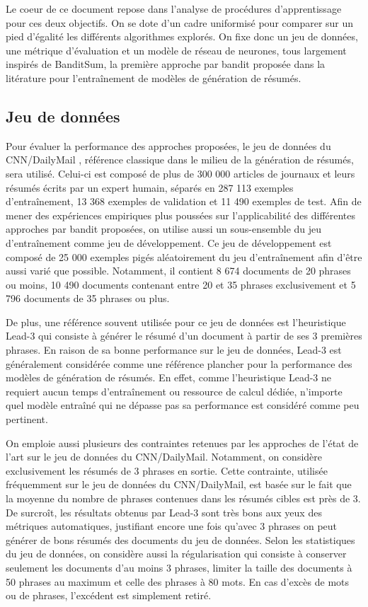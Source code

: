 Le coeur de ce document repose dans l'analyse de procédures 
d'apprentissage pour ces deux objectifs.
On se dote d'un cadre uniformisé pour comparer sur un pied d'égalité
les différents algorithmes explorés.
On fixe donc un jeu de données, une métrique d'évaluation 
et un modèle de réseau de neurones, tous largement inspirés
de BanditSum, la première approche par bandit proposée
dans la litérature pour 
l'entraînement de modèles de génération de résumés.


\subsection{Jeu de données}
\label{subsec:jeu_donnees}

Pour évaluer la performance des approches proposées, le jeu de données du
CNN/DailyMail \citep{hermann2015teaching}, référence classique dans le milieu
de la génération de résumés, sera utilisé.
Celui-ci est composé de plus de 300 000 articles de journaux et
leurs résumés écrits par un expert humain, séparés en 
287 113 exemples d'entraînement, 13 368 exemples de validation 
et 11 490 exemples de test.
Afin de mener des expériences empiriques plus poussées sur l'applicabilité
des différentes approches par bandit proposées, on utilise aussi un sous-ensemble 
du jeu d'entraînement comme jeu de développement.
Ce jeu de développement est composé de 25 000 exemples pigés 
aléatoirement du jeu d'entraînement afin d'être aussi varié que possible.
Notamment, il contient 8 674 documents de 20 phrases ou moins, 10 490
documents contenant entre 20 et 35 phrases exclusivement et 5 796 documents 
de 35 phrases ou plus.

De plus, une référence souvent utilisée pour ce jeu de données est l'heuristique
Lead-3 \citep{10.5555/3298483.3298681} qui consiste à générer le résumé d'un 
document à partir de ses 3 premières phrases.
En raison de sa bonne performance sur le jeu de données,
Lead-3 est généralement considérée comme une référence plancher pour la performance 
des modèles de génération de résumés.
En effet, comme l'heuristique Lead-3 ne requiert aucun temps d'entraînement 
ou ressource de calcul dédiée, n'importe quel modèle entraîné qui ne 
dépasse pas sa performance est considéré comme peu pertinent.

On emploie aussi plusieurs des contraintes retenues par les approches
de l'état de l'art sur le jeu de données du CNN/DailyMail.
Notamment, on considère exclusivement les résumés
de 3 phrases en sortie.
Cette contrainte, utilisée fréquemment sur le jeu de données du CNN/DailyMail,
est basée sur le fait que la moyenne du nombre de phrases contenues dans les résumés cibles
est près de 3.
De surcroît, les résultats obtenus par Lead-3 sont très bons aux yeux des métriques automatiques,
justifiant encore une fois qu'avec 3 phrases on peut générer de bons résumés des documents du jeu
de données.
Selon les statistiques du jeu de données, on considère aussi la régularisation
qui consiste à conserver seulement les documents d'au moins 3 phrases, limiter la taille des documents à
50 phrases au maximum et celle des phrases à 80 mots.
En cas d'excès de mots ou de phrases, l'excédent est simplement retiré.


